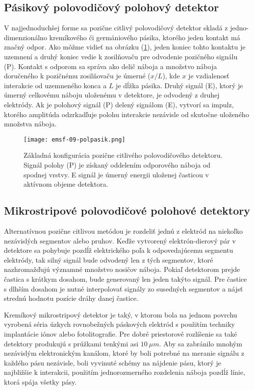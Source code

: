 \documentclass[../../main.tex]{subfiles}
\begin{document}
\subsection{Pásikový polovodičový polohový detektor} 
V najjednoduchšej forme sa pozične citlivý polovodičový detektor skladá z jedno-dimenzionálno kremíkového či germániového pásika, ktorého jeden kontakt má značný odpor. Ako môžme vidieť na obrázku (\ref{em9:fig:polpasik}), jeden koniec tohto kontaktu je uzemnení a druhý koniec vedie k zosilňovaču pre odvodenie pozičného signálu (P). Kontakt s odporom sa správa ako delič náboja a množstvo náboja doručeného k pozičnému zosilňovaču je úmerné ($x/L$), kde $x$ je vzdialenosť interakcie od uzemneného konca a $L$ je dĺžka pásika. Druhý signál (E), ktorý je úmerný celkovému náboju uloženému v detektore, je odvodený z druhej elektródy. Ak je polohový signál (P) delený signálom (E), vytvorí sa impulz, ktorého amplitúda odzrkadľuje polohu interakcie nezávisle od skutočne uloženého množstva náboja. 

\begin{figure}[!h]
\texttt{[image: emsf-09-polpasik.png]}
\centering
\caption{Základná konfigurácia pozične citlivého polovodičového detektoru. Signál polohy (P) je získaný oddelením odporového náboja od spodnej vrstvy. E signál je úmerný energii uloženej časticou v aktívnom objeme detektora.}
\label{em9:fig:polpasik}
\end{figure}

\subsection{Mikrostripové polovodičové polohové detektory} 
Alternatívnou pozične citlivou metódou je rozdeliť jednú z elektród na niekoľko nezávislých segmentov alebo pruhov. Keďže vytvorený elektrón-dierový pár v detektore sa pohybuje pozdĺž elektrického poľa k odpovedajúcemu segmentu elektródy, tak silný signál bude odvodený len z tých segmentov, ktoré nazhromažďujú významné množstvo nosičov náboja. Pokiaľ detektorom prejde častica s krátkym dosahom, bude generovaný len jeden takýto signál. Pre častice s dlhším dosahom je nutné interpolovať signály zo susedných segmentov a nájsť strednú hodnotu pozície dráhy danej častice.

Kremíkový mikrostripový detektor je taký, v ktorom bola na jednom povrchu vyrobená séria úzkych rovnobežných páskových elektród s použitím techniky implantácie iónov alebo fotolitografie. Pre dobré priestorové rozlíšenie sa také detektory produkujú s prúžkami tenkými asi $10\: \mu m$. Aby sa zabránilo mnohým nezávislým elektronickým kanálom, ktoré by boli potrebné na meranie signálu z každého pásu nezávisle, boli vyvinuté schémy na nájdenie pásu, ktorý je najbližšie k interakcii, použitím jednorozmerného rozdelenia náboja pozdĺž línie, ktorá spája všetky pásy.
\end{document}
